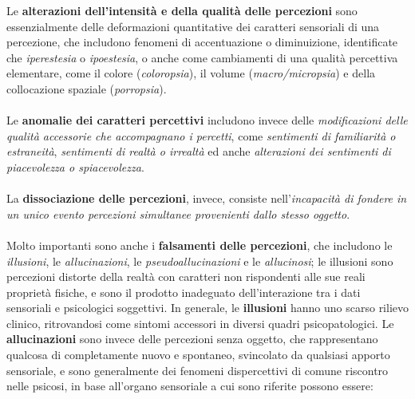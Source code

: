 Le \textbf{alterazioni dell'intensità e della qualità delle percezioni}
sono essenzialmente delle deformazioni quantitative dei caratteri
sensoriali di una percezione, che includono fenomeni di accentuazione o
diminuizione, identificate che \emph{iperestesia} o \emph{ipoestesia}, o
anche come cambiamenti di una qualità percettiva elementare, come il
colore (\emph{coloropsia}), il volume (\emph{macro/micropsia}) e della
collocazione spaziale (\emph{porropsia}).
\\\\
Le \textbf{anomalie dei caratteri percettivi} includono invece delle
\emph{modificazioni delle qualità accessorie che accompagnano i
percetti}, come \emph{sentimenti di familiarità o estraneità},
\emph{sentimenti di realtà o irrealtà} ed anche \emph{alterazioni dei
sentimenti di piacevolezza o spiacevolezza}.
\\\\
La \textbf{dissociazione delle percezioni}, invece, consiste
nell'\emph{incapacità di fondere in un unico evento percezioni
simultanee provenienti dallo stesso oggetto}.
\\\\
Molto importanti sono anche i \textbf{falsamenti delle percezioni}, che
includono le \emph{illusioni}, le \emph{allucinazioni}, le
\emph{pseudoallucinazioni} e le \emph{allucinosi}; le illusioni sono
percezioni distorte della realtà con caratteri non rispondenti alle sue
reali proprietà fisiche, e sono il prodotto inadeguato dell'interazione
tra i dati sensoriali e psicologici soggettivi. In generale, le
\textbf{illusioni} hanno uno scarso rilievo clinico, ritrovandosi come
sintomi accessori in diversi quadri psicopatologici. Le
\textbf{allucinazioni} sono invece delle percezioni senza oggetto, che
rappresentano qualcosa di completamente nuovo e spontaneo, svincolato da
qualsiasi apporto sensoriale, e sono generalmente dei fenomeni
dispercettivi di comune riscontro nelle psicosi, in base all'organo
sensoriale a cui sono riferite possono essere:

